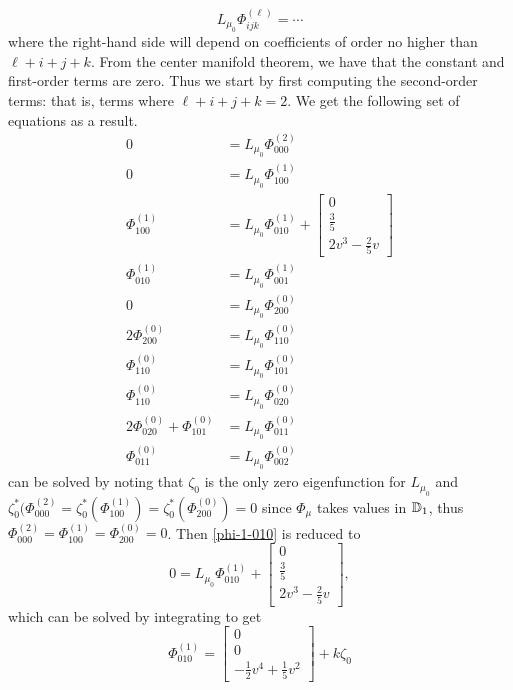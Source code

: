 \begin{equation}
	L_{\mu_0} \Phi^{(\ell)}_{ijk} = \cdots
\end{equation}
where the right-hand side will depend on coefficients of order no higher than \(\ell + i + j + k\). From the center manifold theorem, we have that the constant and first-order terms are zero. Thus we start by first computing the second-order terms: that is, terms where \(\ell + i + j + k = 2\). We get the following set of equations as a result.
\begin{align}
	0 &= L_{\mu_0} \Phi^{(2)}_{000} \label{phi-2-000}\\ 
	0 & = L_{\mu_0} \Phi^{(1)}_{100} \label{phi-1-100} \\
	\Phi^{(1)}_{100}  & = L_{\mu_0} \Phi^{(1)}_{010} + \begin{bmatrix} 0 \\ \frac 35 \\ 2v^3 - \frac 2 5 v \end{bmatrix} \label{phi-1-010} \\
	\Phi^{(1)}_{010}  & = L_{\mu_0} \Phi^{(1)}_{001} \label{phi-1-001} \\
	0 & = L_{\mu_0} \Phi^{(0)}_{200} \label{phi-0-200}\\
	2\Phi^{(0)}_{200}  & = L_{\mu_0} \Phi^{(0)}_{110} \\ 
		\Phi^{(0)}_{110}  & = L_{\mu_0} \Phi^{(0)}_{101} \\
	\Phi^{(0)}_{110}  & = L_{\mu_0} \Phi^{(0)}_{020} \\
	2\Phi^{(0)}_{020}  + \Phi^{(0)}_{101} & = L_{\mu_0} \Phi^{(0)}_{011} \\
	\Phi^{(0)}_{011}  & = L_{\mu_0} \Phi^{(0)}_{002} 
\end{align}
 can be solved by noting that \(\zeta_0\) is the only zero eigenfunction for \(L_{\mu_0}\) and \(\zeta_0^*(\Phi_{000}^{(2) } = \zeta_0^*(\Phi_{100}^{(1)}) = \zeta_0^*(\Phi_{200}^{(0)}) = 0\) since \(\Phi_\mu\) takes values in \(\mathbb{D}_1\), thus \(\Phi_{000}^{(2)} = \Phi_{100}^{(1)} =\Phi_{200}^{(0)} = 0\). Then \cref{phi-1-010} is reduced to 
\begin{equation}
	0 =  L_{\mu_0} \Phi^{(1)}_{010} + \begin{bmatrix} 0 \\ \frac 35 \\ 2v^3 - \frac 2 5 v \end{bmatrix},
\end{equation}
which can be solved by integrating to get 
\begin{equation}
	\Phi_{010}^{(1)} = \begin{bmatrix}
		0 \\ 0 \\ - \frac 1 2 v^4 + \frac 1 5 v^2
	\end{bmatrix} + k  \zeta_0
\end{equation}
